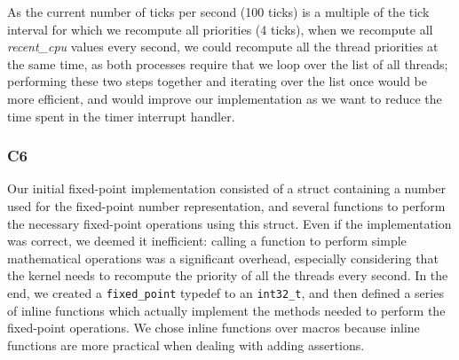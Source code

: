 \documentclass[a4wide, 11pt]{article}
\newcommand{\tx}{\texttt}
\begin{document}
As the current number of ticks per second (100 ticks) is a multiple of the tick interval for which we recompute all priorities (4 ticks), when we recompute all \textit{recent\_cpu} values every second, we could recompute all the thread priorities at the same time, as both processes require that we loop over the list of all threads; performing these two steps together and iterating over the list once would be more efficient, and would improve our implementation as we want to reduce the time spent in the timer interrupt handler.

\subsubsection{C6}

Our initial fixed-point implementation consisted of a struct containing a number used for the fixed-point number representation, and several functions to perform the necessary fixed-point operations using this struct. Even if the implementation was correct, we deemed it inefficient: calling a function to perform simple mathematical operations was a significant overhead, especially considering that the kernel needs to recompute the priority of all the threads every second. In the end, we created a \tx{fixed\_point} typedef to an \tx{int32\_t}, and then defined a series of inline functions which actually implement the methods needed to perform the fixed-point operations. We chose inline functions over macros because inline functions are more practical when dealing with adding assertions.
\end{document}
